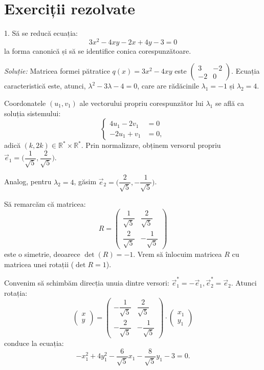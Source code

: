 

\section{Exerciții rezolvate}

1. Să se reducă ecuația: 
 \[
	3x^2 - 4xy - 2x + 4y - 3 = 0
\]
la forma canonică și să se identifice conica corespunzătoare.

\emph{Soluție:}
	Matricea formei pătratice $q(x) = 3x^2 - 4xy$ este $\begin{pmatrix}
	                                                       3 & -2 \\
	                                                       -2 & 0
                                                       \end{pmatrix}$.
    Ecuația caracteristică este, atunci, $\lambda^2 - 3\lambda - 4 = 0$, care
are rădăcinile $\lambda_1 = -1$ și $\lambda_2 = 4$.

Coordonatele $(u_1, v_1)$ ale vectorului propriu corespunzător lui $\lambda_1$
se află ca soluția sistemului: 
 \[
	\begin{cases}	
	    4u_1 - 2v_1 &= 0 \\
	    -2 u_1 + v_1 &= 0,
    \end{cases}
\]
adică $(k, 2k) \in \mathbb{R}^\ast \times \mathbb{R}^\ast$. Prin normalizare,
obținem versorul propriu 
$\vec{e}_1 = \Big( \dfrac{1}{\sqrt{5}}, \dfrac{2}{\sqrt{5}} \Big)$.

Analog, pentru $\lambda_2 = 4$, găsim 
$\vec{e}_2 = \Big( \dfrac{2}{\sqrt{5}}, - \dfrac{1}{\sqrt{5}} \Big)$.

Să remarcăm că matricea: 
 \[
	R = \begin{pmatrix}
	        \dfrac{1}{\sqrt{5}} & \dfrac{2}{\sqrt{5}} \\
	        \dfrac{2}{\sqrt{5}} & - \dfrac{1}{\sqrt{5}}
        \end{pmatrix}
\]
este o simetrie, deoarece $\det(R) = -1$. Vrem să înlocuim matricea $R$ cu
matricea unei rotații ($ \det R = 1 $).

Convenim să schimbăm direcția unuia dintre versori:
$\vec{e}_1^\ast = -\vec{e}_1, \vec{e}_2^\ast = \vec{e}_2$. Atunci rotația: 
 \[
	\begin{pmatrix}
	    x \\ y
    \end{pmatrix} = \begin{pmatrix}
	                    -\dfrac{1}{\sqrt{5}} & \dfrac{2}{\sqrt{5}} \\
	                    -\dfrac{2}{\sqrt{5}} & -\dfrac{1}{\sqrt{5}}
                    \end{pmatrix} \cdot \begin{pmatrix}
	                                        x_1 \\ y_1 
                                        \end{pmatrix}
\]
conduce la ecuația: 
 \[
	-x_1^2 + 4y_1^2 - \dfrac{6}{\sqrt{5}} x_1 - \dfrac{8}{\sqrt{5}} y_1 - 3 = 0.
\]

